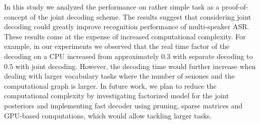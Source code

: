 \documentclass[a4paper]{article}
\newcommand{\spkrA}{a}
\newcommand{\spkrB}{b}
\begin{document}

In this study we analyzed the performance on rather simple task as a proof-of-concept of the joint decoding scheme. The results suggest that considering joint decoding could greatly improve recognition performance of multi-speaker ASR. These results come at the expense of increased computational complexity. For example, in our experiments we observed that the real time factor of the decoding on a CPU increased from approximately $0.3$ with separate decoding to $0.5$ with joint decoding. However, the decoding time would further increase when dealing with larger vocabulary tasks where the number of senones and the computational graph is larger. In future work, we plan to reduce the computational complexity by investigating factorized model for the joint posteriors and implementing fast decoder using pruning, sparse matrices and GPU-based computations\cite{ondel2021}, which would allow tackling larger tasks.

\end{document}
